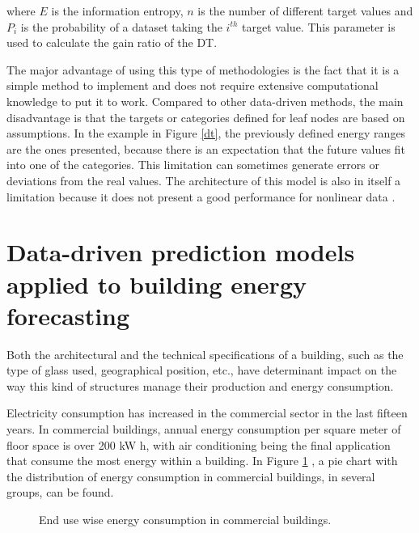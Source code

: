 where $E$ is the information entropy, $n$ is the number of different target values and $P_i$ is the probability of a dataset taking the $i^{th}$ target value. This parameter is used to calculate the gain ratio of the \ac{DT}.

The major advantage of using this type of methodologies is the fact that it is a simple method to implement and does not require extensive computational knowledge to put it to work. Compared to other data-driven methods, the main disadvantage is that the targets or categories defined for leaf nodes are based on assumptions. In the example in Figure \ref{dt}, the previously defined energy ranges are the ones presented, because there is an expectation that the future values fit into one of the categories. This limitation can sometimes generate errors or deviations from the real values. The architecture of this model is also in itself a limitation because it does not present a good performance for nonlinear data \cite{dt2}.


\section{Data-driven prediction models applied to building energy forecasting \label{c}}

Both the architectural and the technical specifications of a building, such as the type of glass used, geographical position, etc., have determinant impact on the way this kind of structures manage their production and energy consumption. 

Electricity consumption has increased in the commercial sector in the last fifteen years.  In commercial buildings, annual energy consumption per square meter of floor space is over 200 kW h, with air conditioning being the final application that consume the most energy within a building\cite{pie_1}. In Figure \ref{buildingenergy} \cite{pie_1}, a pie chart with the distribution of energy consumption in commercial buildings, in several groups, can be found.


\begin{figure}[h!]
    \centering
    \begin{center}
    \caption{End use wise energy consumption in commercial buildings.}
    \label{buildingenergy}
    \end{center}
\end{figure}


